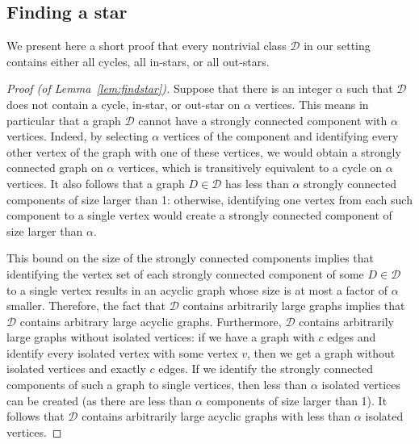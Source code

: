 \documentclass[a4paper,11pt]{article}
\newcommand{\calD}{\mathcal{D}}
\theoremstyle{plain}
\newtheorem{identification rule}{Identification Rule}
\theoremstyle{definition}
\theoremstyle{remark}
\begin{document}
\subsection{Finding a star}
We present here a short proof that every nontrivial class $\calD$ in our setting contains either all cycles, all in-stars, or all out-stars.
\label{sec:findstar}
\begin{proof}[Proof (of Lemma~\ref{lem:findstar})]
  Suppose that there is an integer $\alpha$ such that $\calD$ does not contain a cycle, in-star, or out-star on $\alpha$ vertices. This means in particular that a graph $\calD$ cannot have a strongly connected component with $\alpha$ vertices. Indeed, by selecting $\alpha$ vertices of the component and identifying every other vertex of the graph with one of these vertices, we would obtain a strongly connected graph on $\alpha$ vertices, which is transitively equivalent to a cycle on $\alpha$ vertices.
It also follows that a graph $D\in\calD$ has less than $\alpha$ strongly connected components of size larger than 1: otherwise, identifying one vertex from each such component to a single vertex would create a strongly connected component of size larger than $\alpha$.
  
This bound on the size of the strongly connected components implies that identifying the vertex set of each strongly connected component of some $D\in\calD$ to a single vertex results in an acyclic graph whose size is at most a factor of $\alpha$ smaller. Therefore, the fact that $\calD$ contains arbitrarily large graphs implies that $\calD$ contains arbitrary large acyclic graphs.
Furthermore, $\calD$ contains arbitrarily large graphs without isolated vertices: if we have a graph with $c$ edges and identify every isolated vertex with some vertex $v$, then we get a graph without isolated vertices and exactly $c$ edges. If we identify the strongly connected components of such a graph to single vertices, then less than $\alpha$ isolated vertices can be created (as there are less than $\alpha$ components of size larger than 1). It follows that $\calD$ contains arbitrarily large acyclic graphs with less than $\alpha$ isolated vertices. 


\end{proof}
\end{document}

